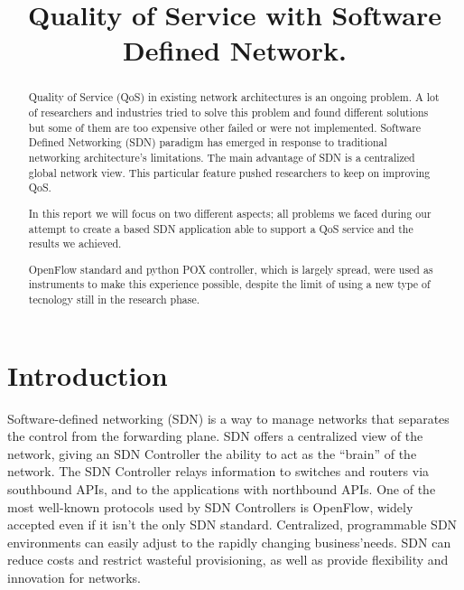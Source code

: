\documentclass[article,10pt]{IEEEtran}
\begin{document}
\title{Quality of Service with Software Defined Network.}

\author{
}

\maketitle		

\begin{abstract}
Quality of Service (QoS) in existing network architectures is an ongoing problem.
A lot of researchers and industries tried to solve this problem and found different solutions but some of them are too
expensive other failed or were not implemented.
Software Defined Networking (SDN) paradigm has emerged in response to traditional networking architecture's limitations.
The main advantage of SDN is a centralized global network view. This particular feature pushed researchers to keep on improving QoS.

In this report we will focus on two different aspects; all problems we faced during our attempt to create a based SDN application able to
support a QoS service and the results we achieved.

OpenFlow standard and python POX controller, which is largely spread, were used as instruments to make this experience possible,
despite the limit of using a new type of tecnology still in the research phase.
\end{abstract}

\section{Introduction}\label{sec:intro}
Software-defined networking (SDN) is a way to manage networks that separates the control from the forwarding plane.
SDN offers a centralized view of the network, giving an SDN Controller the ability to act as the “brain” of the network.
The SDN Controller relays information to switches and routers via southbound APIs, and to the applications with northbound APIs.
One of the most well-known protocols used by SDN Controllers is OpenFlow, widely accepted even if it isn’t the only SDN standard. 
Centralized, programmable SDN environments can easily adjust to the rapidly changing business'needs. SDN can reduce costs and restrict
wasteful provisioning, as well as provide flexibility and innovation for networks.
\end{document}
